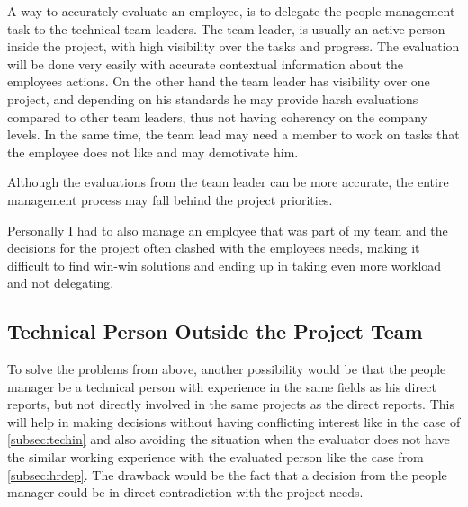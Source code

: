 A way to accurately evaluate an employee, is to delegate the people management task to the technical team leaders. The team leader, is usually an active person inside the project, with high visibility over the tasks and progress. The evaluation will be done very easily with accurate contextual information about the employees actions. On the other hand the team leader has visibility over one project, and depending on his standards he may provide harsh evaluations compared to other team leaders, thus not having coherency on the company levels. In the same time, the team lead may need a member to work on tasks that the employee does not like and may demotivate him. 

Although the evaluations from the team leader can be more accurate, the entire management process may fall behind the project priorities. 

Personally I had to also manage an employee that was part of my team and the decisions for the project often clashed with the employees needs, making it difficult to find win-win solutions and ending up in taking even more workload and not delegating.

\subsection{Technical Person Outside the Project Team}
\label{subsec:techout}

To solve the problems from above, another possibility would be that the people manager be a technical person with experience in the same fields as his direct reports, but not directly involved in the same projects as the direct reports. This will help in making decisions without having conflicting interest like in the case of \cref{subsec:techin} and also avoiding the situation when the evaluator does not have the similar working experience with the evaluated person like the case from \cref{subsec:hrdep}. The drawback would be the fact that a decision from the people manager could be in direct contradiction with the project needs.

